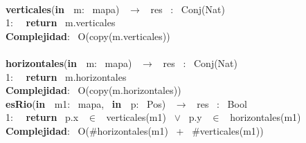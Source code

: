 \begin{Algoritmos}
\makebox[\linewidth]{\rule{\textwidth}{0.4pt}}
\\
\makebox[\linewidth]{\rule{\textwidth}{0.4pt}}
\textbf{verticales}(\textbf{in \ }m: \ mapa) \ $\longrightarrow$ \ res \ : \ Conj(Nat)\\
1: \  \ \textbf{return} \ m.verticales\\
\textbf{Complejidad}: \ O(copy(m.verticales))\\
\makebox[\linewidth]{\rule{\textwidth}{0.4pt}}
\\
\makebox[\linewidth]{\rule{\textwidth}{0.4pt}}
\textbf{horizontales}(\textbf{in \ }m: \ mapa) \ $\longrightarrow$ \ res \ : \ Conj(Nat)\\
1: \  \ \textbf{return} \ m.horizontales\\
\textbf{Complejidad}: \ O(copy(m.horizontales))\\
\makebox[\linewidth]{\rule{\textwidth}{0.4pt}}
\noindent\makebox[\linewidth]{\rule{\textwidth}{0.4pt}}
\textbf{esRio}(\textbf{in \ }m1: \ mapa, \ \textbf{in \ }p: \ Pos) \ $\longrightarrow$ \ res \ : \ Bool\\
1: \  \ \textbf{return} \ p.x \ $\in$ \ verticales(m1) \ $\vee$ \ p.y \ $\in$ \ horizontales(m1)\\
\textbf{Complejidad}: \ O($ \# $horizontales(m1) \ + \ $ \# $verticales(m1))\\
\noindent\makebox[\linewidth]{\rule{\textwidth}{0.4pt}}

\end{Algoritmos}
